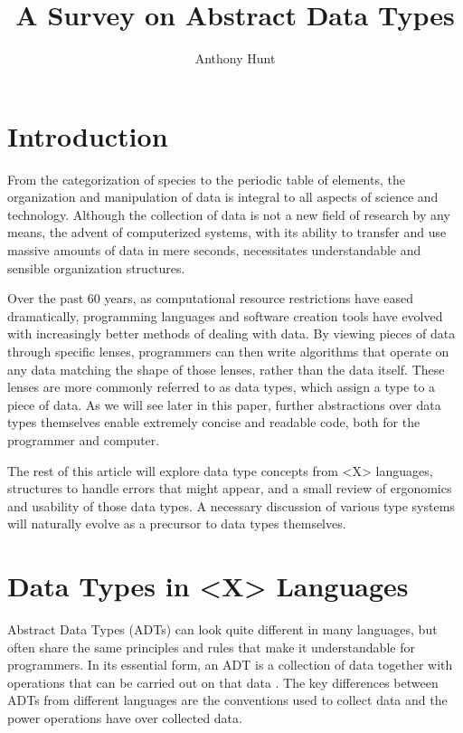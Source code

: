 \documentclass{article}
\title{A Survey on Abstract Data Types}
\author{Anthony Hunt}
\begin{document}
\maketitle
\tableofcontents

\section{Introduction}

From the categorization of species to the periodic table of elements, the organization and manipulation
of data is integral to all aspects of science and technology. Although the collection of data is not a
new field of research by any means, the advent of computerized systems, with its ability to transfer and use
massive amounts of data in mere seconds, necessitates understandable and sensible organization structures.

Over the past 60 years, as computational resource restrictions have eased dramatically,
programming languages and software creation tools have evolved with increasingly better methods of dealing with data.
By viewing pieces of data through specific lenses, programmers can then write algorithms that operate on
any data matching the shape of those lenses, rather than the data itself. These lenses are more commonly referred to as
data types, which assign a type to a piece of data. As we will see later in this paper,
further abstractions over data types themselves enable extremely concise and readable code,
both for the programmer and computer.

The rest of this article will explore data type concepts from <X> languages, %
structures to handle errors that might appear, and a small review of ergonomics and usability of those data types.
A necessary discussion of various type systems will naturally evolve as a precursor to data types themselves.

\section{Data Types in <X> Languages} %

Abstract Data Types (ADTs) can look quite different in many languages, but often share the same principles and rules
that make it understandable for programmers. In its essential form, an ADT is a collection of data together with
operations that can be carried out on that data \cite{ADTspec}. The key differences between ADTs from different languages
are the conventions used to collect data and the power operations have over collected data.
\end{document}
